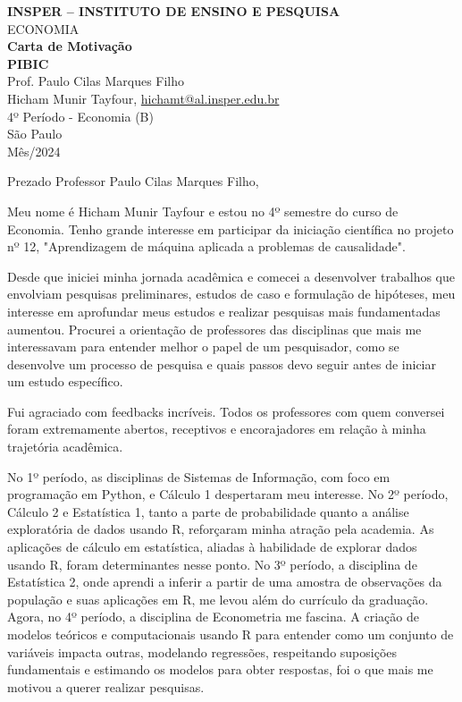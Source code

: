 \documentclass[a4paper,12pt]{article}[abntex2]
\begin{document}
\begin{titlepage}
    \centering
    \vspace*{1cm}
    \Large\textbf{INSPER – INSTITUTO DE ENSINO E PESQUISA}\\
    \Large ECONOMIA\\
    \vspace{1.5cm}
    \Large\textbf{Carta de Motivação}\\
    \textbf{PIBIC}\\
    \vspace{1.5cm}
    Prof. Paulo Cilas Marques Filho\\
    \vfill
    \normalsize
    Hicham Munir Tayfour, \href{mailto:hichamt@al.insper.edu.br}{hichamt@al.insper.edu.br}\\
    4º Período - Economia (B)\\
    \vfill
    São Paulo\\
    Mês/2024
\end{titlepage}

\newpage
Prezado Professor Paulo Cilas Marques Filho,

Meu nome é Hicham Munir Tayfour e estou no 4º semestre do curso de Economia. Tenho grande interesse em participar da iniciação científica no projeto nº 12, "Aprendizagem de máquina aplicada a problemas de causalidade".

Desde que iniciei minha jornada acadêmica e comecei a desenvolver trabalhos que envolviam pesquisas preliminares, estudos de caso e formulação de hipóteses, meu interesse em aprofundar meus estudos e realizar pesquisas mais fundamentadas aumentou. Procurei a orientação de professores das disciplinas que mais me interessavam para entender melhor o papel de um pesquisador, como se desenvolve um processo de pesquisa e quais passos devo seguir antes de iniciar um estudo específico.

Fui agraciado com feedbacks incríveis. Todos os professores com quem conversei foram extremamente abertos, receptivos e encorajadores em relação à minha trajetória acadêmica.

No 1º período, as disciplinas de Sistemas de Informação, com foco em programação em Python, e Cálculo 1 despertaram meu interesse. No 2º período, Cálculo 2 e Estatística 1, tanto a parte de probabilidade quanto a análise exploratória de dados usando R, reforçaram minha atração pela academia. As aplicações de cálculo em estatística, aliadas à habilidade de explorar dados usando R, foram determinantes nesse ponto. No 3º período, a disciplina de Estatística 2, onde aprendi a inferir a partir de uma amostra de observações da população e suas aplicações em R, me levou além do currículo da graduação. Agora, no 4º período, a disciplina de Econometria me fascina. A criação de modelos teóricos e computacionais usando R para entender como um conjunto de variáveis impacta outras, modelando regressões, respeitando suposições fundamentais e estimando os modelos para obter respostas, foi o que mais me motivou a querer realizar pesquisas.
\end{document}
